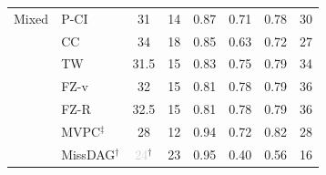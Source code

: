\begin{tabular}{llcccccc}
    \midrule
    Mixed     & P-CI               & 31 & 14 & 0.87 & 0.71 & 0.78 & 30 \\
              & CC                 & 34 & 18 & 0.85 & 0.63 & 0.72 & 27 \\
              & TW                 & 31.5 & 15 & 0.83 & 0.75 & 0.79 & 34 \\
              & FZ-v               & 32 & 15 & 0.81 & 0.78 & 0.79 & 36 \\
              & FZ-R               & 32.5 & 15 & 0.81 & 0.78 & 0.79 & 36 \\
              & MVPC$^\ddagger$    & 28 & 12 & 0.94 & 0.72 & 0.82 & 28 \\
              & MissDAG$^\dagger$  & \textcolor{lightgray}{24}$^\dagger$ & 23 & 0.95 & 0.40 & 0.56 & 16 \\
    \bottomrule
\end{tabular}
